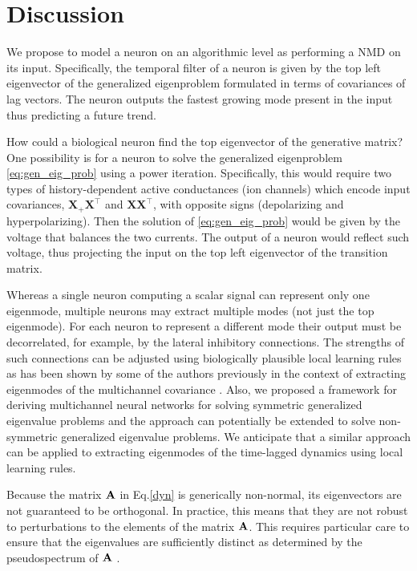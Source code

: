 \documentclass[%
 reprint,
 amsmath,amssymb,
 aps,
]{revtex4-2}
\begin{document}

\section{Discussion}
We propose to model a neuron on an algorithmic level as performing a NMD on its input. Specifically, the temporal filter of a neuron is given by the top left eigenvector of the generalized eigenproblem formulated in terms of covariances of lag vectors. The neuron outputs the fastest growing mode present in the input thus predicting a future trend.

How could a biological neuron find the top eigenvector of the generative matrix? One possibility is for a neuron to solve the generalized eigenproblem \eqref{eq:gen_eig_prob} using a power iteration. Specifically, this would require two types of history-dependent active conductances (ion channels) which encode input covariances, $\mathbf{X_+X^\top}$ and $\mathbf{XX^\top}$, with opposite signs (depolarizing and hyperpolarizing). Then the solution of \eqref{eq:gen_eig_prob} would be given by the voltage that balances the two currents. The output of a neuron would reflect such voltage, thus projecting the input on the top left eigenvector of the transition matrix.

Whereas a single neuron computing a scalar signal can represent only one eigenmode, multiple neurons may extract multiple modes (not just the top eigenmode). For each neuron to represent a different mode their output must be decorrelated, for example, by the lateral inhibitory connections. The strengths of such connections can be adjusted using biologically plausible local learning rules as has been shown by some of the authors previously in the context of extracting eigenmodes of the multichannel covariance \cite{pehlevan2015hebbian,pehlevan2017similarity,pehlevan2019neuroscience}. Also, we proposed a framework for deriving multichannel neural networks for solving symmetric generalized eigenvalue problems \cite{PRXLife.1.013008} and the approach can potentially be extended to solve non-symmetric generalized eigenvalue problems. We anticipate that a similar approach can be applied to extracting eigenmodes of the time-lagged dynamics using local learning rules.

Because the matrix ${\bf A}$ in Eq.\eqref{dyn} is generically non-normal, its eigenvectors are not guaranteed to be orthogonal. In practice, this means that they are not robust to perturbations to the elements of the matrix ${\bf A}$. This requires particular care to ensure that the eigenvalues are sufficiently distinct as determined by the pseudospectrum of ${\bf A}$ \cite{TrefethenEmbree+2020}.  
\end{document}
